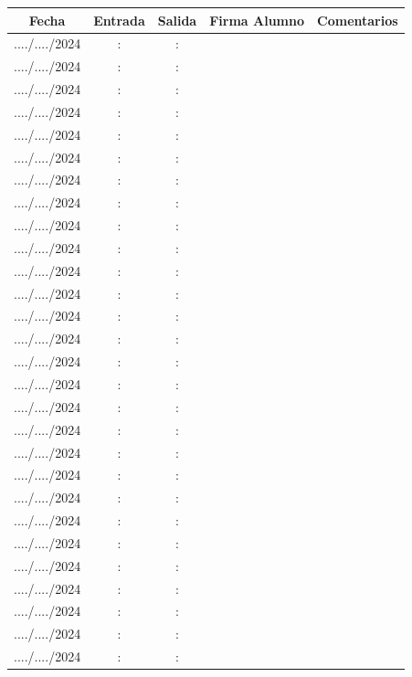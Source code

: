\documentclass[../main]{subfiles}
\begin{document}
\begin{table}[h]
    \centering
    \begin{tabular}{|c|c|c|p{5cm}|p{5cm}|} \hline 
         Fecha& Entrada &Salida & Firma Alumno& Comentarios  \\\hline \hline
       ..../..../2024 & : & : & & \\ \hline
       ..../..../2024 & : & : & & \\ \hline
       ..../..../2024 & : & : & & \\ \hline
       ..../..../2024 & : & : & & \\ \hline
       ..../..../2024 & : & : & & \\ \hline
       ..../..../2024 & : & : & & \\ \hline
       ..../..../2024 & : & : & & \\ \hline
       ..../..../2024 & : & : & & \\ \hline
       ..../..../2024 & : & : & & \\ \hline
       ..../..../2024 & : & : & & \\ \hline
       ..../..../2024 & : & : & & \\ \hline
       ..../..../2024 & : & : & & \\ \hline
       ..../..../2024 & : & : & & \\ \hline
       ..../..../2024 & : & : & & \\ \hline
       ..../..../2024 & : & : & & \\ \hline
       ..../..../2024 & : & : & & \\ \hline
       ..../..../2024 & : & : & & \\ \hline
       ..../..../2024 & : & : & & \\ \hline
       ..../..../2024 & : & : & & \\ \hline
       ..../..../2024 & : & : & & \\ \hline
       ..../..../2024 & : & : & & \\ \hline
       ..../..../2024 & : & : & & \\ \hline
       ..../..../2024 & : & : & & \\ \hline
       ..../..../2024 & : & : & & \\ \hline
       ..../..../2024 & : & : & & \\ \hline
       ..../..../2024 & : & : & & \\ \hline
       ..../..../2024 & : & : & & \\ \hline
       ..../..../2024 & : & : & & \\ \hline
 
      
    
    \end{tabular}
\end{table}
\end{document}
